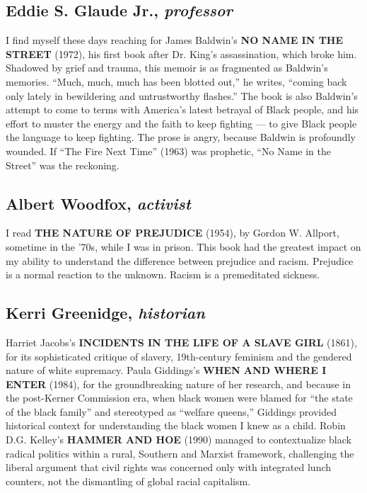 \hypertarget{eddie-s-glaude-jr-professor}{%
\subsection{\texorpdfstring{Eddie S. Glaude Jr.,
\emph{professor}}{Eddie S. Glaude Jr., professor}}\label{eddie-s-glaude-jr-professor}}

I find myself these days reaching for James Baldwin's \textbf{NO NAME IN
THE STREET} (1972), his first book after Dr. King's assassination, which
broke him. Shadowed by grief and trauma, this memoir is as fragmented as
Baldwin's memories. ``Much, much, much has been blotted out,'' he
writes, ``coming back only lately in bewildering and untrustworthy
flashes.'' The book is also Baldwin's attempt to come to terms with
America's latest betrayal of Black people, and his effort to muster the
energy and the faith to keep fighting --- to give Black people the
language to keep fighting. The prose is angry, because Baldwin is
profoundly wounded. If ``The Fire Next Time'' (1963) was prophetic, ``No
Name in the Street'' was the reckoning.

\hypertarget{albert-woodfox-activist}{%
\subsection{\texorpdfstring{Albert Woodfox,
\emph{activist}}{Albert Woodfox, activist}}\label{albert-woodfox-activist}}

I read \textbf{THE NATURE OF PREJUDICE} (1954), by Gordon W. Allport,
sometime in the '70s, while I was in prison. This book had the greatest
impact on my ability to understand the difference between prejudice and
racism. Prejudice is a normal reaction to the unknown. Racism is a
premeditated sickness.

\hypertarget{kerri-greenidge-historian}{%
\subsection{\texorpdfstring{Kerri Greenidge,
\emph{historian}}{Kerri Greenidge, historian}}\label{kerri-greenidge-historian}}

Harriet Jacobs's \textbf{INCIDENTS IN THE LIFE OF A SLAVE GIRL} (1861),
for its sophisticated critique of slavery, 19th-century feminism and the
gendered nature of white supremacy. Paula Giddings's \textbf{WHEN AND
WHERE I ENTER} (1984), for the groundbreaking nature of her research,
and because in the post-Kerner Commission era, when black women were
blamed for ``the state of the black family'' and stereotyped as
``welfare queens,'' Giddings provided historical context for
understanding the black women I knew as a child. Robin D.G. Kelley's
\textbf{HAMMER AND HOE} (1990) managed to contextualize black radical
politics within a rural, Southern and Marxist framework, challenging the
liberal argument that civil rights was concerned only with integrated
lunch counters, not the dismantling of global racial capitalism.

